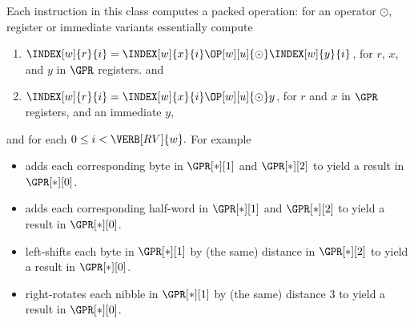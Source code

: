 Each instruction in this class 
computes a packed operation: for an operator $\odot$, register or immediate 
variants essentially compute

\begin{enumerate}
\item $\INDEX[w]{r}{i} = \INDEX[w]{x}{i} \OP[w][u]{\odot} \INDEX[w]{y}{i}$,
      for $r$, $x$, and $y$ in $\GPR$ registers.
      and
\item $\INDEX[w]{r}{i} = \INDEX[w]{x}{i} \OP[w][u]{\odot}           y    $,
      for $r$       and $x$ in $\GPR$ registers, and an immediate $y$,
\end{enumerate}

\noindent
and for each 
$
0 \leq i < \VERB[RV]{w} .
$ 
For example

\begin{itemize}
\item {}
      adds 
      each corresponding 
           byte 
      in
      $\GPR[*][1]$
      and
      $\GPR[*][2]$
      to yield a result in
      $\GPR[*][0]$.

\item {} 
      adds
      each corresponding 
      half-word
      in
      $\GPR[*][1]$
      and
      $\GPR[*][2]$
      to yield a result in
      $\GPR[*][0]$.

\item {} 
      left-shifts 
      each
           byte
      in
      $\GPR[*][1]$
      by (the same) distance in
      $\GPR[*][2]$
      to yield a result in
      $\GPR[*][0]$.

\item {} 
      right-rotates
      each
           nibble
      in
      $\GPR[*][1]$
      by (the same) distance
      $3$
      to yield a result in
      $\GPR[*][0]$.
\end{itemize}




